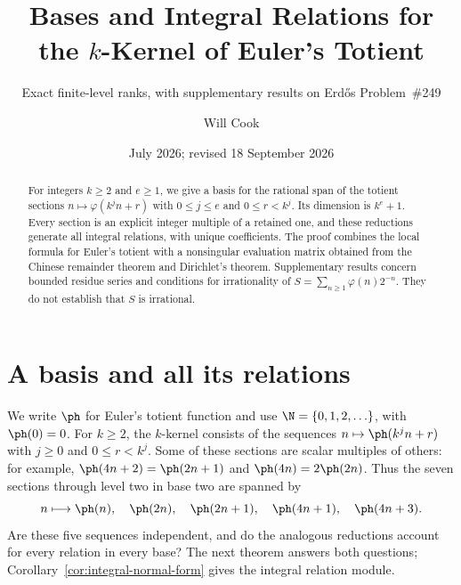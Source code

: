 \documentclass[11pt]{article}
\title{Bases and Integral Relations for the $k$-Kernel of Euler's Totient}
\subtitle{Exact finite-level ranks, with supplementary results on
Erd\H{o}s Problem~\#249}
\author{Will Cook}
\date{July 2026; revised 18 September 2026}
\begin{document}
\maketitle
\noteprovenance

\begin{abstract}
For integers $k\ge2$ and $e\ge1$, we give a basis for the rational span
of the totient sections $n\mapsto\varphi(k^jn+r)$ with
$0\le j\le e$ and $0\le r<k^j$. Its dimension is $k^e+1$.
Every section is an explicit integer multiple of a retained one, and
these reductions generate all integral relations, with unique
coefficients. The proof combines the local formula for Euler's totient
with a nonsingular evaluation matrix obtained from the Chinese remainder
theorem and Dirichlet's theorem. Supplementary results concern bounded
residue series and conditions for irrationality of
$S=\sum_{n\ge1}\varphi(n)2^{-n}$. They do not establish that $S$ is
irrational.
\end{abstract}


\section{A basis and all its relations}\label{sec:results}
We write $\ph$ for Euler's totient function and use
$\N=\{0,1,2,\ldots\}$, with $\ph(0)=0$. For $k\ge2$,
the $k$-kernel consists of the sequences
$n\mapsto\ph(k^jn+r)$ with $j\ge0$ and $0\le r<k^j$.
Some of these sections are scalar multiples of others: for example,
$\ph(4n+2)=\ph(2n+1)$ and $\ph(4n)=2\ph(2n)$. Thus the seven sections
through level two in base two are spanned by
\[
 n\longmapsto\ph(n),\quad\ph(2n),\quad\ph(2n+1),\quad
 \ph(4n+1),\quad\ph(4n+3).
\]
Are these five sequences independent, and do the analogous reductions
account for every relation in every base? The next theorem answers both
questions; Corollary~\ref{cor:integral-normal-form} gives the integral
relation module.
\end{document}
